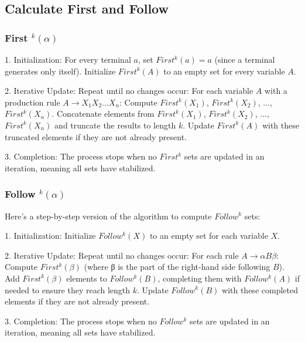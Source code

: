 
\subsection{Calculate First and Follow}
\subsubsection{First $^k(\alpha)$}
1. Initialization:
   For every terminal $a$, set $First^k(a) = {a}$ (since a terminal generates only itself).
   Initialize $First^k(A)$ to an empty set for every variable $A$.

2. Iterative Update:
   Repeat until no changes occur:
     For each variable $A$ with a production rule $A → X_1 X_2 ... X_n$:
     Compute $First^k(X_1)$, $First^k(X_2)$, ..., $First^k(X_n)$.
     Concatenate elements from $First^k(X_1)$, $First^k(X_2)$, ..., $First^k(X_n)$ and truncate the results to length $k$.
       Update $First^k(A)$ with these truncated elements if they are not already present.

3. Completion:
   The process stops when no $First^k$ sets are updated in an iteration, meaning all sets have stabilized.

\subsubsection{Follow $^k(\alpha)$}
Here's a step-by-step version of the algorithm to compute $Follow^k$ sets:

1. Initialization:
   Initialize $Follow^k(X)$ to an empty set for each variable $X$.

2. Iterative Update:
   Repeat until no changes occur:
     For each rule $A → αBβ$:
       Compute $First^k(β)$ (where β is the part of the right-hand side following $B$).
       Add $First^k(β)$ elements to $Follow^k(B)$, completing them with $Follow^k(A)$ if needed to ensure they reach length $k$.
       Update $Follow^k(B)$ with these completed elements if they are not already present.

3. Completion:
   The process stops when no $Follow^k$ sets are updated in an iteration, meaning all sets have stabilized.


